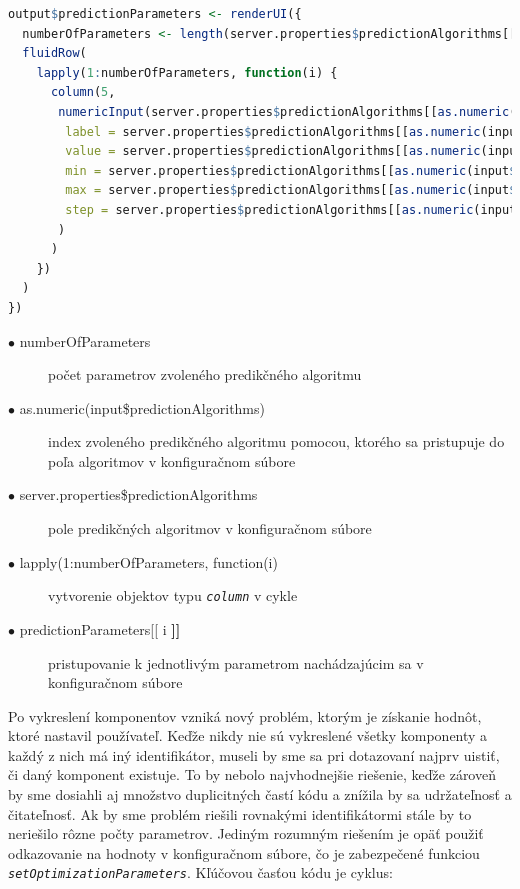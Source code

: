 \documentclass[a4paper,slovak,12pt,appendix]{article}
\begin{document}
\begin{lstlisting}[language=R]
output$predictionParameters <- renderUI({
  numberOfParameters <- length(server.properties$predictionAlgorithms[[as.numeric(input$predictionAlgorithms)]]$predictionParameters)
  fluidRow(
    lapply(1:numberOfParameters, function(i) {
      column(5,
       numericInput(server.properties$predictionAlgorithms[[as.numeric(input$predictionAlgorithms)]]$predictionParameters[[i]]$id,
        label = server.properties$predictionAlgorithms[[as.numeric(input$predictionAlgorithms)]]$predictionParameters[[i]]$label,
        value = server.properties$predictionAlgorithms[[as.numeric(input$predictionAlgorithms)]]$predictionParameters[[i]]$value,
        min = server.properties$predictionAlgorithms[[as.numeric(input$predictionAlgorithms)]]$predictionParameters[[i]]$min,
        max = server.properties$predictionAlgorithms[[as.numeric(input$predictionAlgorithms)]]$predictionParameters[[i]]$max,
        step = server.properties$predictionAlgorithms[[as.numeric(input$predictionAlgorithms)]]$predictionParameters[[i]]$step
       )
      )
    })
  )
})
\end{lstlisting}

\begin{description}
  \item[$\bullet$ numberOfParameters] počet parametrov zvoleného predikčného algoritmu
  \item[$\bullet$ as.numeric(input\$predictionAlgorithms)] index zvoleného predikčného algoritmu pomocou, ktorého sa pristupuje do poľa algoritmov v konfiguračnom súbore
  \item[$\bullet$ server.properties\$predictionAlgorithms] pole predikčných algoritmov v konfiguračnom súbore
  \item[$\bullet$ lapply(1:numberOfParameters, function(i)] vytvorenie objektov typu \texttt{\textit{column}} v cykle
  \item[$\bullet$ predictionParameters[[ i \textbf{]]} ] pristupovanie k jednotlivým parametrom nachádzajúcim sa v konfiguračnom súbore
\end{description}

Po vykreslení komponentov vzniká nový problém, ktorým je získanie hodnôt, ktoré
nastavil používateľ. Keďže nikdy nie sú vykreslené všetky komponenty a každý
z nich má iný identifikátor, museli by sme sa pri dotazovaní najprv uistiť,
či daný komponent existuje. To by nebolo najvhodnejšie riešenie, keďže zároveň
by sme dosiahli aj množstvo duplicitných častí kódu a znížila by sa udržateľnosť
a čitateľnosť. Ak by sme problém riešili rovnakými identifikátormi stále by to
neriešilo rôzne počty parametrov. Jediným rozumným riešením je opäť použiť
odkazovanie na hodnoty v konfiguračnom súbore, čo je zabezpečené funkciou
\texttt{\textit{setOptimizationParameters}}. Kľúčovou časťou kódu je cyklus:
\end{document}
